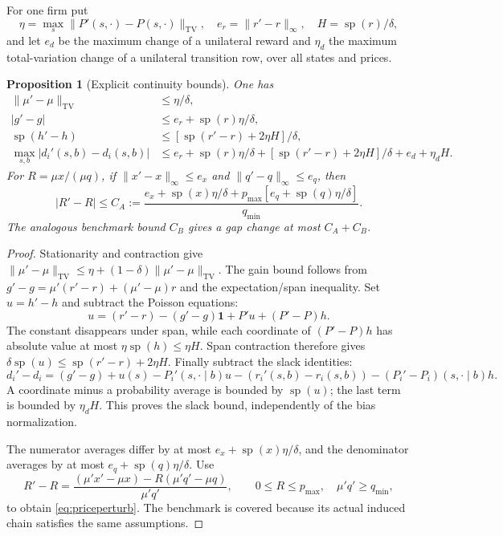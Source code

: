 \documentclass[11pt,a4paper]{article}
\newtheorem{proposition}[theorem]{Proposition}
\newcommand{\spn}{\operatorname{sp}}
\newcommand{\TV}{\operatorname{TV}}
\begin{document}
For one firm put
\[
 \eta=\max_s\|P'(s,\cdot)-P(s,\cdot)\|_{\TV},\quad
 e_r=\|r'-r\|_\infty,\quad H=\spn(r)/\delta,
\]
and let $e_d$ be the maximum change of a unilateral reward and $\eta_d$ the
maximum total-variation change of a unilateral transition row, over all states
and prices.

\begin{proposition}[Explicit continuity bounds]\label{prop:robust}
One has
\begin{align*}
 \|\mu'-\mu\|_{\TV}&\leq\eta/\delta,\\
 |g'-g|&\leq e_r+\spn(r)\eta/\delta,\\
 \spn(h'-h)&\leq[\spn(r'-r)+2\eta H]/\delta,\\
 \max_{s,b}|d_i'(s,b)-d_i(s,b)|
 &\leq e_r+\spn(r)\eta/\delta
       +[\spn(r'-r)+2\eta H]/\delta+e_d+\eta_dH.
\end{align*}
For $R=\mu x/(\mu q)$, if $\|x'-x\|_\infty\leq e_x$ and
$\|q'-q\|_\infty\leq e_q$, then
\begin{equation}\label{eq:priceperturb}
 |R'-R|\leq C_A:=\frac{e_x+\spn(x)\eta/\delta
       +p_{\max}[e_q+\spn(q)\eta/\delta]}{q_{\min}}.
\end{equation}
The analogous benchmark bound $C_B$ gives a gap change at most $C_A+C_B$.
\end{proposition}
\begin{proof}
Stationarity and contraction give
$\|\mu'-\mu\|_{\TV}\leq\eta+(1-\delta)\|\mu'-\mu\|_{\TV}$.
The gain bound follows from
$g'-g=\mu'(r'-r)+(\mu'-\mu)r$ and the expectation/span inequality.
Set $u=h'-h$ and subtract the Poisson equations:
\[
 u=(r'-r)-(g'-g)\boldsymbol1+P'u+(P'-P)h.
\]
The constant disappears under span, while each coordinate of $(P'-P)h$ has
absolute value at most $\eta\spn(h)\leq\eta H$. Span contraction therefore
gives $\delta\spn(u)\leq\spn(r'-r)+2\eta H$.
Finally subtract the slack identities:
\[
 d_i'-d_i=(g'-g)+u(s)-P_i'(s,\cdot\mid b)u
 -(r_i'(s,b)-r_i(s,b))-(P_i'-P_i)(s,\cdot\mid b)h.
\]
A coordinate minus a probability average is bounded by $\spn(u)$; the last
term is bounded by $\eta_dH$. This proves the slack bound, independently of
the bias normalization.

The numerator averages differ by at most $e_x+\spn(x)\eta/\delta$, and the
denominator averages by at most $e_q+\spn(q)\eta/\delta$. Use
\[
 R'-R=\frac{(\mu'x'-\mu x)-R(\mu'q'-\mu q)}{\mu'q'},
 \qquad 0\leq R\leq p_{\max},\quad\mu'q'\geq q_{\min},
\]
to obtain \eqref{eq:priceperturb}. The benchmark is covered because its
actual induced chain satisfies the same assumptions.
\end{proof}
\end{document}

